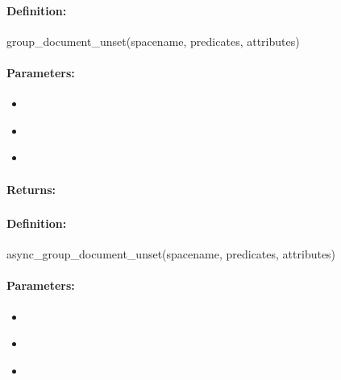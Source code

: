 \paragraph{Definition:}
\begin{rubycode}
group_document_unset(spacename, predicates, attributes)
\end{rubycode}

\paragraph{Parameters:}
\begin{itemize}[noitemsep]
\item {}\\

\item {}\\

\item {}\\

\end{itemize}

\paragraph{Returns:}


\pagebreak
\subsubsection{}
\label{api:ruby:async_group_document_unset}


\paragraph{Definition:}
\begin{rubycode}
async_group_document_unset(spacename, predicates, attributes)
\end{rubycode}

\paragraph{Parameters:}
\begin{itemize}[noitemsep]
\item {}\\

\item {}\\

\item {}\\

\end{itemize}


